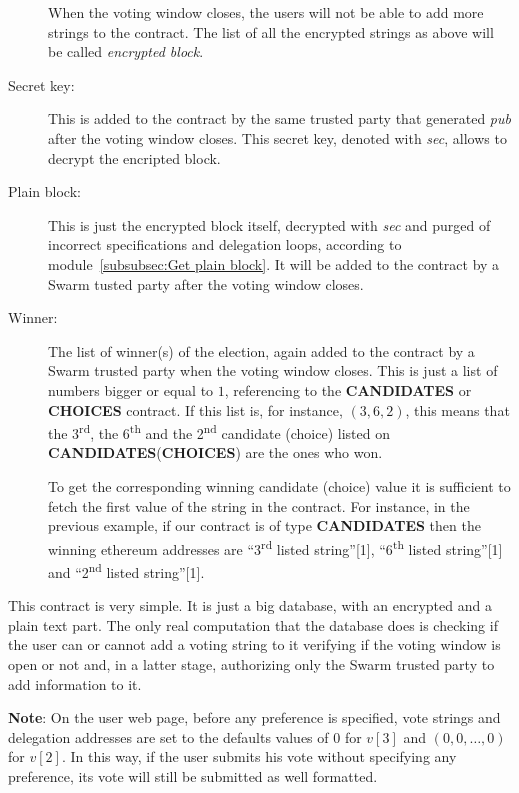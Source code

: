 \documentclass[submission, copyright,creativecommons,sharealike,noncommercial]{eptcs}
\newcommand{\Candidates}{\textbf{CANDIDATES}\xspace}
\newcommand{\Choices}{\textbf{CHOICES}\xspace}
\begin{document}
\begin{description}
		When the voting window closes, the users will not be able to add more strings to the contract. The list of all the encrypted strings as above will be called \emph{encrypted block}.
		
		\item[Secret key:] This is added to the contract by the same trusted party that generated \emph{pub} after the voting window closes. This secret key, denoted with \emph{sec}, allows to decrypt the encripted block.
		
		\item[Plain block:] This is just the encrypted block itself, decrypted with \emph{sec} and purged of incorrect specifications and delegation loops, according to module~\ref{subsubsec:Get plain block}. It will be added to the contract by a Swarm tusted party after the voting window closes.
			
		\item[Winner:] The list of winner(s) of the election, again added to the contract by a Swarm trusted party when the voting window closes. This is just a list of numbers bigger or equal to $1$, referencing to the \Candidates or \Choices contract. If this list is, for instance, $(3,6,2)$, this means that the 3\textsuperscript{rd}, the 6\textsuperscript{th} and the 2\textsuperscript{nd} candidate (choice) listed on \Candidates (\Choices) are the ones who won. 
		
		To get the corresponding winning candidate (choice) value it is sufficient to fetch the first value of the string in the contract. For instance, in the previous example, if our contract is of type \Candidates then the winning ethereum addresses are ``3\textsuperscript{rd} listed string''[1], ``6\textsuperscript{th} listed string''[1] and ``2\textsuperscript{nd} listed string''[1].

	\end{description}
	This contract is very simple. It is just a big database, with an encrypted and a plain text part. The only real computation that the database does is checking if the user can or cannot add a voting string to it verifying if the voting window is open or not and, in a latter stage, authorizing only the Swarm trusted party to add information to it.

	\textbf{Note}: On the user web page, before any preference is specified, vote strings and delegation addresses are set to the defaults values of $0$ for $v[3]$ and $(0,0, \dots, 0)$ for $v[2]$. In this way, if the user submits his vote without specifying any preference, its vote will still be submitted as well formatted.
		
\end{document}
